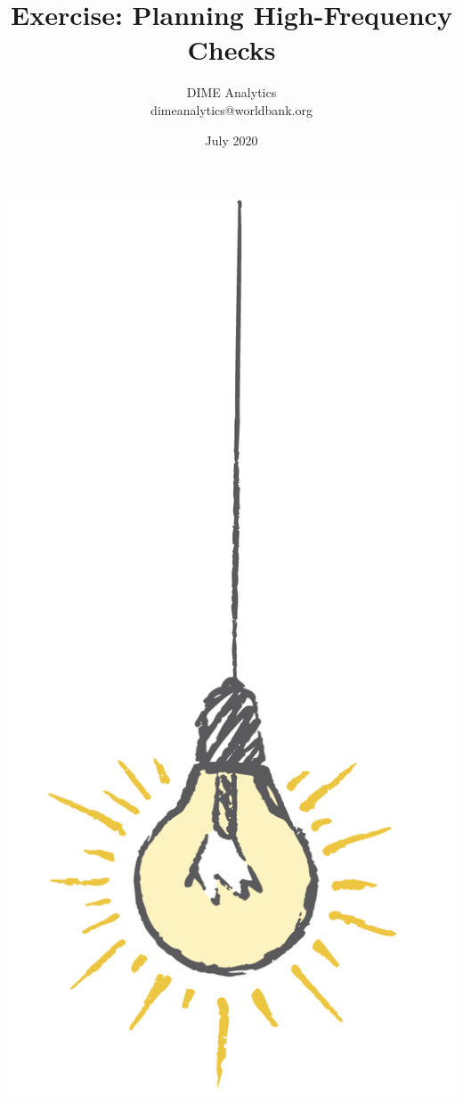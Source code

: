 \documentclass{tufte-handout}
\title{Exercise: Planning High-Frequency Checks}
\author{DIME Analytics \\ dimeanalytics@worldbank.org}
\date{July 2020}  %
\begin{document}
\maketitle%

\begin{marginfigure}%
  \includegraphics[width=\linewidth]{"img/Light bulb-01"}
\end{marginfigure}
\end{document}

